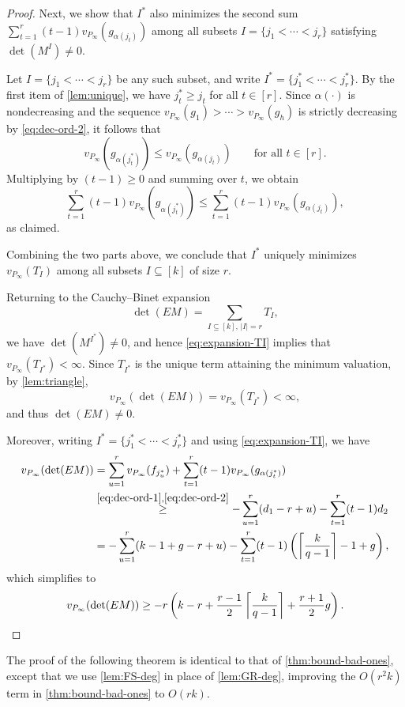 \documentclass[11pt]{article}
\begin{document}
\begin{proof}
Next, we show that $I^*$ also minimizes the second sum $\sum_{t=1}^r (t-1)v_{P_\infty}(g_{\alpha(j_t)})$
among all subsets $I=\{j_1<\cdots<j_r\}$ satisfying $\det(M^I)\neq 0$.

Let $I=\{j_1<\cdots<j_r\}$ be any such subset, and write $I^*=\{j_1^*<\cdots<j_r^*\}$.
By the first item of \cref{lem:unique}, we have $j_t^*\ge j_t$ for all $t\in [r]$.
Since $\alpha(\cdot)$ is nondecreasing and the sequence
$v_{P_\infty}(g_1) > \cdots > v_{P_\infty}(g_h)$
is strictly decreasing by \eqref{eq:dec-ord-2}, it follows that
\[
v_{P_\infty}(g_{\alpha(j_t^*)})
\le
v_{P_\infty}(g_{\alpha(j_t)})
\qquad\text{for all } t\in [r].
\]
Multiplying by $(t-1)\ge 0$ and summing over $t$, we obtain
\[
\sum_{t=1}^r (t-1)v_{P_\infty}(g_{\alpha(j_t^*)})
\le
\sum_{t=1}^r (t-1)v_{P_\infty}(g_{\alpha(j_t)}),
\]
as claimed.

Combining the two parts above, we conclude that $I^*$ uniquely minimizes $v_{P_\infty}(T_I)$ among all subsets $I\subseteq [k]$ of size $r$.

Returning to the Cauchy--Binet expansion
\[
\det(EM)=\sum_{I\subseteq [k],\, |I|=r} T_I,
\]
we have $\det(M^{I^*})\neq 0$, and hence \eqref{eq:expansion-TI} implies that
$v_{P_\infty}(T_{I^*}) < \infty$.
Since $T_{I^*}$ is the unique term attaining the minimum valuation, by \cref{lem:triangle},
\[
v_{P_\infty}(\det(EM)) = v_{P_\infty}(T_{I^*}) < \infty,
\]
and thus $\det(EM)\neq 0$.

Moreover, writing $I^*=\{j_1^*<\cdots<j_r^*\}$ and using \eqref{eq:expansion-TI}, we have
\begin{align*}
v_{P_\infty}(\det(EM))
&=
\sum_{u=1}^r v_{P_\infty}(f_{j_u^*})
+
\sum_{t=1}^r (t-1)v_{P_\infty}(g_{\alpha(j_t^*)})\\
&\stackrel{\eqref{eq:dec-ord-1},\eqref{eq:dec-ord-2}}{\ge}
-\sum_{u=1}^r(d_1-r+u)-\sum_{t=1}^r (t-1)d_2\\
&=-\sum_{u=1}^r(k-1+g-r+u)-\sum_{t=1}^r (t-1)\left(\left\lceil\frac{k}{q-1}\right\rceil-1+g\right),
\end{align*}
which simplifies to
\[
v_{P_\infty}(\det(EM))\geq -r\left(
k-r+\frac{r-1}{2}\left\lceil \frac{k}{q-1}\right\rceil+\frac{r+1}{2}g 
\right).\qedhere
\]
\end{proof}

The proof of the following theorem is identical to that of \cref{thm:bound-bad-ones}, except that we use \cref{lem:FS-deg} in place of \cref{lem:GR-deg}, improving the $O(r^2 k)$ term in \cref{thm:bound-bad-ones} to $O(rk)$.
\end{document}
